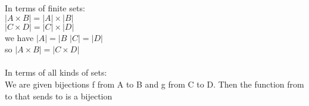 \documentclass[UTF8]{article}
\begin{document}
\begin{description}
        In terms of finite sets:  \\
        \hspace*{1cm}    $|{A \times B}| = |{A}| \times |{B}|$ \\
        \hspace*{1cm}    $|{C \times D}| = |{C}| \times |{D}|$ \\
        \hspace*{1cm}    we have \quad $|{A}| = |{B}$ \quad $|{C}|= |{D}|$ \\
        \hspace*{1cm}    so \quad $|{A \times B}|=|{C \times D}|$  \\\\
        In terms of all kinds of sets: \\
        \hspace*{1cm}   We are given bijections f from A to B and g from C to D. Then the function from to that sends to is a bijection   \\



        
        
\end{description}
\end{document}
